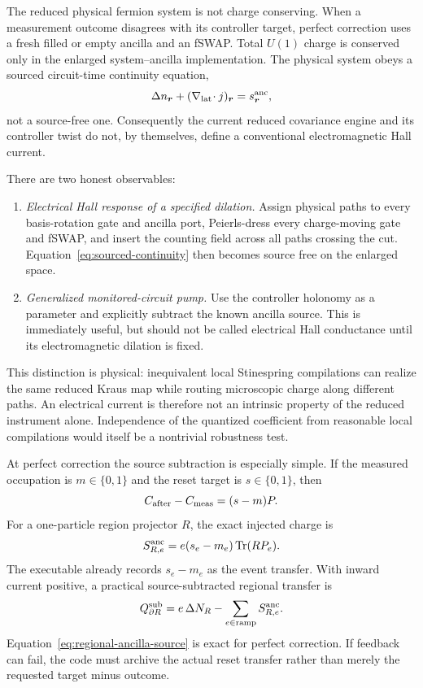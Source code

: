 \documentclass[aps,prb,onecolumn,nofootinbib,superscriptaddress]{revtex4-2}
\newcommand{\Tr}{\operatorname{Tr}}
\newcommand{\br}{\bm r}
\begin{document}
The reduced physical fermion system is not charge conserving.  When a
measurement outcome disagrees with its controller target, perfect correction
uses a fresh filled or empty ancilla and an fSWAP.  Total $U(1)$ charge is
conserved only in the enlarged system--ancilla implementation.  The physical
system obeys a sourced circuit-time continuity equation,
\begin{equation}
  \Delta n_{\br}+(\nabla_{\rm lat}\!\cdot j)_{\br}
  =s^{\rm anc}_{\br},
  \label{eq:sourced-continuity}
\end{equation}
not a source-free one.  Consequently the current reduced covariance engine and
its controller twist do not, by themselves, define a conventional
electromagnetic Hall current.

There are two honest observables:
\begin{enumerate}
  \item \emph{Electrical Hall response of a specified dilation.}  Assign
  physical paths to every basis-rotation gate and ancilla port, Peierls-dress
  every charge-moving gate and fSWAP, and insert the counting field across all
  paths crossing the cut.  Equation~\eqref{eq:sourced-continuity} then becomes
  source free on the enlarged space.
  \item \emph{Generalized monitored-circuit pump.}  Use the controller
  holonomy as a parameter and explicitly subtract the known ancilla source.
  This is immediately useful, but should not be called electrical Hall
  conductance until its electromagnetic dilation is fixed.
\end{enumerate}
This distinction is physical: inequivalent local Stinespring compilations can
realize the same reduced Kraus map while routing microscopic charge along
different paths.  An electrical current is therefore not an intrinsic property
of the reduced instrument alone.  Independence of the quantized coefficient
from reasonable local compilations would itself be a nontrivial robustness
test.

At perfect correction the source subtraction is especially simple.  If the
measured occupation is $m\in\{0,1\}$ and the reset target is $s\in\{0,1\}$,
then
\begin{equation}
  C_{\rm after}-C_{\rm meas}=(s-m)P.
\end{equation}
For a one-particle region projector $R$, the exact injected charge is
\begin{equation}
  S^{\rm anc}_{R,e}=e(s_e-m_e)\Tr(RP_e).
  \label{eq:regional-ancilla-source}
\end{equation}
The executable already records $s_e-m_e$ as the event transfer.  With inward
current positive, a practical source-subtracted regional transfer is
\begin{equation}
  Q^{\rm sub}_{\partial R}
  =e\,\Delta N_R-\sum_{e\in\mathrm{ramp}}S^{\rm anc}_{R,e}.
  \label{eq:source-subtracted-current}
\end{equation}
Equation~\eqref{eq:regional-ancilla-source} is exact for perfect correction.
If feedback can fail, the code must archive the actual reset transfer rather
than merely the requested target minus outcome.
\end{document}
